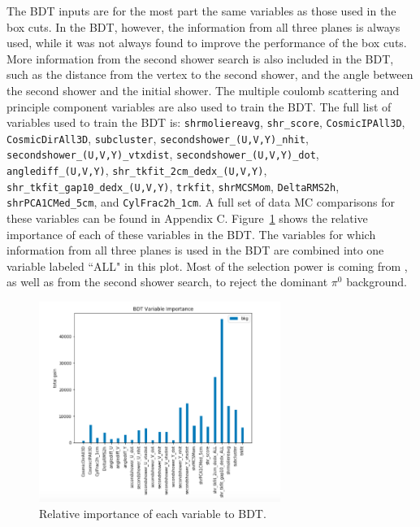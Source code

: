 The BDT inputs are for the most part the same variables as those used in the box cuts. In the BDT, however, the information from all three planes is always used, while it was not always found to improve the performance of the box cuts.   More information from the second shower search is also included in the BDT, such as the distance from the vertex to the second shower, and the angle between the second shower and the initial shower. The multiple coulomb scattering and principle component variables are also used to train the BDT.  The full list of variables used to train the \zpsel BDT is:
\texttt{shrmoliereavg}, \texttt{shr\_score}, \texttt{CosmicIPAll3D}, \texttt{CosmicDirAll3D}, \texttt{subcluster}, \texttt{secondshower\_(U,V,Y)\_nhit}, \texttt{secondshower\_(U,V,Y)\_vtxdist}, \texttt{secondshower\_(U,V,Y)\_dot}, \texttt{anglediff\_(U,V,Y)}, \texttt{shr\_tkfit\_2cm\_dedx\_(U,V,Y)}, \texttt{shr\_tkfit\_gap10\_dedx\_(U,V,Y)}, \texttt{trkfit}, \texttt{shrMCSMom}, \texttt{DeltaRMS2h}, \texttt{shrPCA1CMed\_5cm}, and \texttt{CylFrac2h\_1cm}. 
A full set of data MC comparisons for these variables can be found in Appendix C.  Figure~\ref{fig:1e0p:bdtvars:RUN3} shows the relative importance of each of these variables in the BDT.  The variables for which information from all three planes is used in the BDT are combined into one variable labeled ``ALL" in this plot. Most of the selection power is coming from \dedx, as well as from the second shower search, to reject the dominant  $\pi^{0}$ background. 

\begin{figure}[H]
\begin{center}
\includegraphics[width=0.7\textwidth]{1e0p/run123_bdt/bdt_importance.png}
\caption{\label{fig:1e0p:bdtvars:RUN3} Relative importance of each variable to BDT.}
\end{center}
\end{figure}


